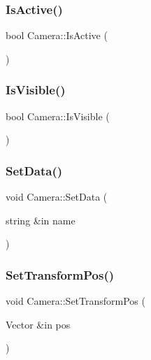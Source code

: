 \hypertarget{class_camera_a602657601be729845b111704b4c13193}{}\label{class_camera_a602657601be729845b111704b4c13193} 
\subsubsection{\texorpdfstring{Is\+Active()}{IsActive()}}
{\footnotesize\ttfamily bool Camera\+::\+Is\+Active (\begin{DoxyParamCaption}{ }\end{DoxyParamCaption})}

\hypertarget{class_camera_a31eb1e05ad8329e2a33291506ce2d0c8}{}\label{class_camera_a31eb1e05ad8329e2a33291506ce2d0c8} 
\subsubsection{\texorpdfstring{Is\+Visible()}{IsVisible()}}
{\footnotesize\ttfamily bool Camera\+::\+Is\+Visible (\begin{DoxyParamCaption}{ }\end{DoxyParamCaption})}

\hypertarget{class_camera_aa2f9cfe6cc8c8d268a8b0782114ba43d}{}\label{class_camera_aa2f9cfe6cc8c8d268a8b0782114ba43d} 
\subsubsection{\texorpdfstring{Set\+Data()}{SetData()}}
{\footnotesize\ttfamily void Camera\+::\+Set\+Data (\begin{DoxyParamCaption}\item[{string \&in}]{name }\end{DoxyParamCaption})}

\hypertarget{class_camera_aa3f6d3f73966736a4b7d9954b6965b34}{}\label{class_camera_aa3f6d3f73966736a4b7d9954b6965b34} 
\subsubsection{\texorpdfstring{Set\+Transform\+Pos()}{SetTransformPos()}}
{\footnotesize\ttfamily void Camera\+::\+Set\+Transform\+Pos (\begin{DoxyParamCaption}\item[{Vector \&in}]{pos }\end{DoxyParamCaption})}

